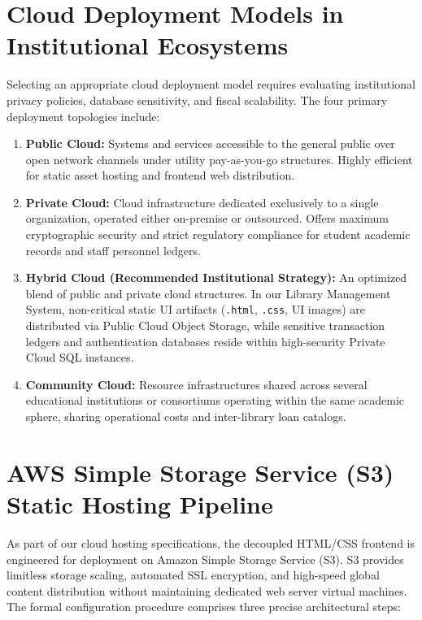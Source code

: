 \documentclass[11pt,a4paper]{report}
\begin{document}
\section{Cloud Deployment Models in Institutional Ecosystems}
Selecting an appropriate cloud deployment model requires evaluating institutional privacy policies, database sensitivity, and fiscal scalability. The four primary deployment topologies include:
\begin{enumerate}[leftmargin=1.5em]
    \item \textbf{Public Cloud:} Systems and services accessible to the general public over open network channels under utility pay-as-you-go structures. Highly efficient for static asset hosting and frontend web distribution.
    \item \textbf{Private Cloud:} Cloud infrastructure dedicated exclusively to a single organization, operated either on-premise or outsourced. Offers maximum cryptographic security and strict regulatory compliance for student academic records and staff personnel ledgers.
    \item \textbf{Hybrid Cloud (Recommended Institutional Strategy):} An optimized blend of public and private cloud structures. In our Library Management System, non-critical static UI artifacts (\texttt{.html}, \texttt{.css}, UI images) are distributed via Public Cloud Object Storage, while sensitive transaction ledgers and authentication databases reside within high-security Private Cloud SQL instances.
    \item \textbf{Community Cloud:} Resource infrastructures shared across several educational institutions or consortiums operating within the same academic sphere, sharing operational costs and inter-library loan catalogs.
\end{enumerate}

\section{AWS Simple Storage Service (S3) Static Hosting Pipeline}
As part of our cloud hosting specifications, the decoupled HTML/CSS frontend is engineered for deployment on Amazon Simple Storage Service (S3). S3 provides limitless storage scaling, automated SSL encryption, and high-speed global content distribution without maintaining dedicated web server virtual machines. The formal configuration procedure comprises three precise architectural steps:
\end{document}
